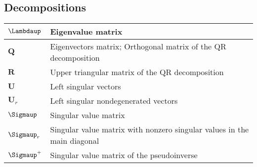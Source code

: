 \documentclass{article}
\begin{document}
\subsection{Decompositions}
\begin{xltabular}{\textwidth}{XX}
	\(\boldsymbol{\Lambdaup}\)                                                                  & Eigenvalue matrix \cite{strangIntroductionLinearAlgebra1993}                                                                                                                         \\ \hline
	\(\mathbf{Q}\)                                                                              & Eigenvectors matrix; Orthogonal matrix of the QR decomposition\cite{strangIntroductionLinearAlgebra1993}                                                                             \\ \hline
	\(\mathbf{R}\)                                                                              & Upper triangular matrix of the QR decomposition\cite{strangIntroductionLinearAlgebra1993}                                                                                            \\ \hline
	\(\mathbf{U}\)                                                                              & Left singular vectors\cite{strangIntroductionLinearAlgebra1993}                                                                                                                      \\ \hline
	\(\mathbf{U}_r\)                                                                            & Left singular nondegenerated vectors                                                                                                                                                 \\ \hline
	\(\boldsymbol{\Sigmaup}\)                                                                   & Singular value matrix                                                                                                                                                                \\ \hline
	\(\boldsymbol{\Sigmaup}_r\)                                                                 & Singular value matrix with nonzero singular values in the main diagonal                                                                                                              \\ \hline
	\(\boldsymbol{\Sigmaup}^{+}\)                                                               & Singular value matrix of the pseudoinverse \cite{strangIntroductionLinearAlgebra1993}                                                                                                \\ \hline

\end{xltabular}
\end{document}
